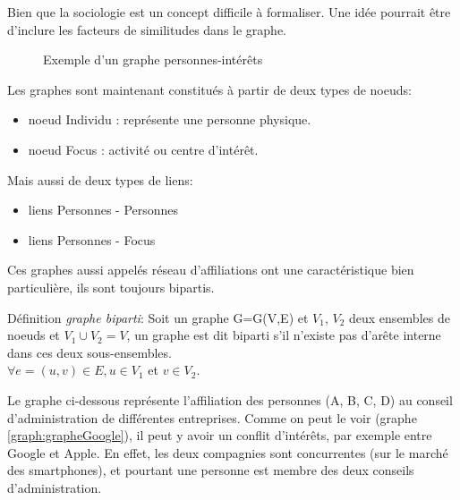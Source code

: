 Bien que la sociologie est un concept difficile à formaliser. 
Une idée pourrait être d'inclure les facteurs de similitudes dans le graphe.

\begin{figure}[!h]
\centering
{}
\caption{Exemple d'un graphe personnes-intérêts}

\label{graph:graphe3-1}
\end{figure}


Les graphes sont maintenant constitués à partir de deux types de noeuds:
\begin{itemize}
\item noeud Individu : représente une personne physique.
\item noeud Focus : activité ou centre d'intérêt.
\end{itemize}

Mais aussi de deux types de liens:
\begin{itemize}
\item liens Personnes - Personnes
\item liens Personnes - Focus
\end{itemize}

Ces graphes aussi appelés réseau d'affiliations ont une caractéristique bien particulière, ils sont toujours bipartis.

\vspace{1ex}
Définition \textit{graphe biparti}: Soit un graphe G=G(V,E) et $V_{1}$, $V_{2}$ deux ensembles de noeuds et $ V_{1} \cup V_{2} = V $, un graphe est dit biparti s'il n'existe pas d'arête interne dans ces deux sous-ensembles.\\ $ \forall e = (u,v)\in E, u \in V_{1}$ et $v \in V_{2} $.

\vspace{1ex}
Le graphe ci-dessous représente l'affiliation des personnes (A, B, C, D) au conseil d'administration de différentes entreprises.
Comme on peut le voir (graphe \ref{graph:grapheGoogle}), il peut y avoir un conflit d'intérêts, par exemple entre Google et Apple. En effet, les deux compagnies sont concurrentes (sur le marché des smartphones), et pourtant une personne est membre des deux conseils d'administration.

